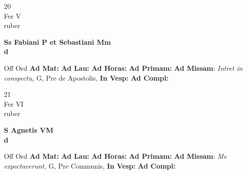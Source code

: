 \documentclass[10pt, openany]{book}
\begin{document}
    \begin{center}
        \begin{minipage}{3.5in}
            \vspace{2em}
            \begin{minipage}{0.5in}
                {\Huge 20} \\
                {\normalsize Fer V} \\
                {\normalsize ruber}
            \end{minipage}
            \begin{minipage}{3.0in}
                \textbf{ \large Ss Fabiani P et Sebastiani Mm \\
                \textnormal{\normalsize d}} \\ 
            \end{minipage}
            \begin{justify}Off Ord
                \textbf{Ad Mat: }
                \textbf{Ad Lau: }
                \textbf{Ad Horas: }
                \textbf{Ad Primam: }\textbf{Ad Missam}: \textit{Intret in conspectu,} G, Pre de Apostolis,  
                \textbf{In Vesp: }
                \textbf{Ad Compl: }
            \end{justify}
        \end{minipage}
    \end{center}

    \begin{center}
        \begin{minipage}{3.5in}
            \vspace{2em}
            \begin{minipage}{0.5in}
                {\Huge 21} \\
                {\normalsize Fer VI} \\
                {\normalsize ruber}
            \end{minipage}
            \begin{minipage}{3.0in}
                \textbf{ \large S Agnetis VM \\
                \textnormal{\normalsize d}} \\ 
            \end{minipage}
            \begin{justify}Off Ord
                \textbf{Ad Mat: }
                \textbf{Ad Lau: }
                \textbf{Ad Horas: }
                \textbf{Ad Primam: }\textbf{Ad Missam}: \textit{Me expectaverunt,} G, Pre Communis,  
                \textbf{In Vesp: }
                \textbf{Ad Compl: }
            \end{justify}
        \end{minipage}
    \end{center}
\end{document}

